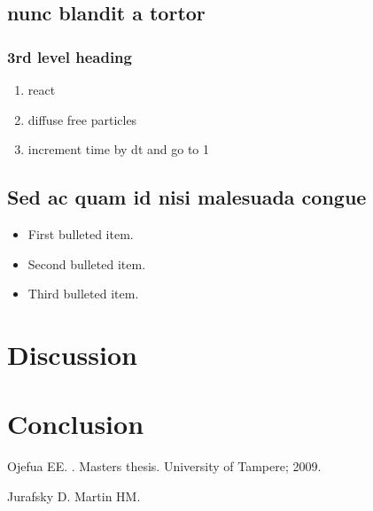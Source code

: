 \documentclass[10pt,letterpaper]{article}
\begin{document}
	
	\subsection*{nunc blandit a tortor}
	\subsubsection*{3rd level heading} 
	
	\begin{enumerate}
		\item{react}
		\item{diffuse free particles}
		\item{increment time by dt and go to 1}
	\end{enumerate}
	
	
	\subsection*{Sed ac quam id nisi malesuada congue}

	
	\begin{itemize}
		\item First bulleted item.
		\item Second bulleted item.
		\item Third bulleted item.
	\end{itemize}
	
	\section*{Discussion}
	
	\section*{Conclusion}
	
	

	\nolinenumbers
	
	\begin{thebibliography}{10}
		
		Ojefua EE.
		.
		\newblock Masters thesis. University of Tampere; 2009.
		
		Jurafsky D. Martin HM.
		
	\end{thebibliography}
	
	
	
\end{document}

